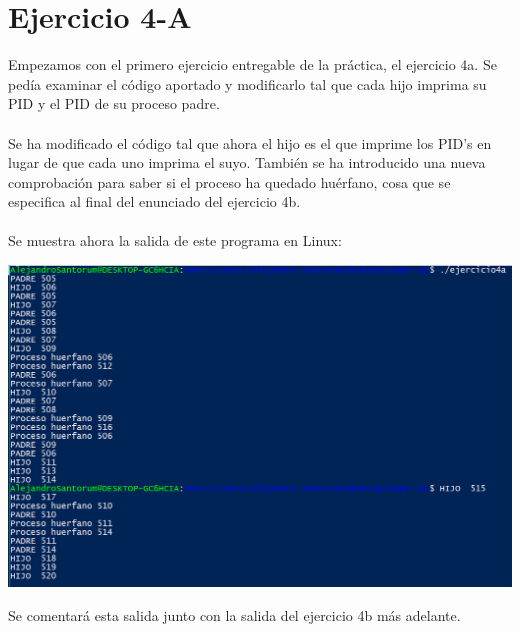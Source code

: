 \documentclass[12pt]{article}
\begin{document}
\section{Ejercicio 4-A}
Empezamos con el primero ejercicio entregable de la práctica, el ejercicio 4a. Se pedía examinar el código aportado y modificarlo tal que cada hijo imprima su PID y el PID de su proceso padre.\\\\
Se ha modificado el código tal que ahora el hijo es el que imprime los PID's en lugar de que cada uno imprima el suyo. También se ha introducido una nueva comprobación para saber si el proceso ha quedado huérfano, cosa que se especifica al final del enunciado del ejercicio 4b.\\\\
Se muestra ahora la salida de este programa en Linux:
\begin{center}
	\includegraphics[scale=0.9]{ej4a.PNG}
\end{center}
Se comentará esta salida junto con la salida del ejercicio 4b más adelante.\\
\end{document}
